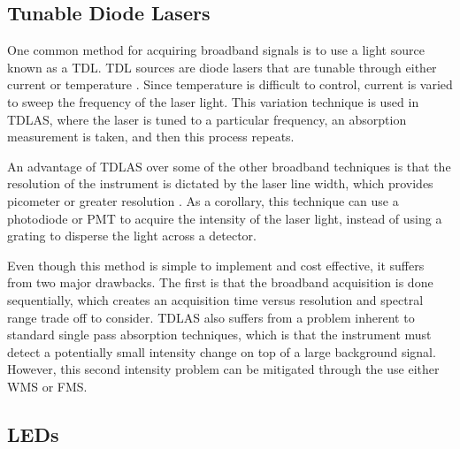 \subsection{Tunable Diode Lasers}\label{subsec:tdl}


One common method for acquiring broadband signals is to use a light source
known as a \acf{TDL}. \ac{TDL} sources are diode lasers that are tunable
through either current or temperature \cite{May:1998ue}. Since temperature is
difficult to control, current is varied to sweep the frequency of the laser
light. This variation technique is used in \ac{TDLAS}, where the laser is
tuned to a particular frequency, an absorption measurement is taken, and then
this process repeats.

An advantage of \ac{TDLAS} over some of the other broadband techniques is
that the resolution of the instrument is dictated by the laser line width,
which provides picometer or greater resolution \cite{Berden:2009wk}. As a
corollary, this technique can use a photodiode or \ac{PMT} to acquire
the intensity of the laser light, instead of using a grating to disperse the
light across a detector.


Even though this method is simple to implement and cost effective, it suffers
from two major drawbacks. The first is that the broadband acquisition is done
sequentially, which creates an acquisition time versus resolution and spectral
range trade off to consider. \ac{TDLAS} also suffers from a problem inherent
to standard single pass absorption techniques, which is that the instrument
must detect a potentially small intensity change on top of a large background
signal. However, this second intensity problem can be mitigated through the use
either \ac{WMS} \cite{Reid:1981vq} or \ac{FMS}.



\subsection{LEDs}\label{subsec:led}

